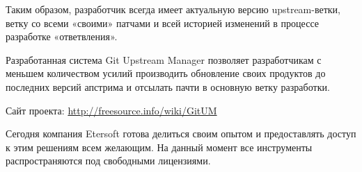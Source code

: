 \documentclass[10pt, a5paper]{article}
\begin{document}
Таким образом, разработчик всегда имеет актуальную версию upstream-ветки, ветку со всеми «своими» патчами и всей историей изменений в процессе разработке «ответвления».

Разработанная система Git Upstream Manager позволяет разработчикам с меньшем количеством усилий производить обновление своих продуктов до последних версий апстрима и отсылать пачти в основную ветку разработки.

Сайт проекта: \href{http://freesource.info/wiki/GitUM}
{http://freesource.info/wiki/GitUM}


Сегодня компания Etersoft готова делиться своим опытом и \linebreak предоставлять доступ к этим решениям всем желающим. На данный момент все инструменты распространяются под свободными лицензиями.
\end{document}
